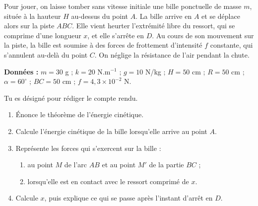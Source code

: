 \begin{center}
\end{center}

Pour jouer, on laisse tomber sans vitesse initiale une bille ponctuelle de masse $m$, située à la
hauteur $H$ au-dessus du point $A$. La bille arrive en $A$ et se déplace alors sur la piste $ABC$.
Elle vient heurter l'extrémité libre du ressort, qui se comprime d'une longueur $x$, et elle
s'arrête en $D$. Au cours de son mouvement sur la piste, la bille est soumise à des forces de
frottement d'intensité $f$ constante, qui s'annulent au-delà du point $C$. On néglige la résistance
de l'air pendant la chute.

\textbf{Données :} $m = 30$ g ; $k = 20$ N.m$^{-1}$ ; $g = 10$ N/kg ; $H = 50$ cm ; $R = 50$ cm ;
$\alpha = 60^\circ$ ; $BC = 50$ cm ; $f = 4,3 \times 10^{-2}$ N.

Tu es désigné pour rédiger le compte rendu.
\begin{enumerate}
  \item Énonce le théorème de l'énergie cinétique.
  \item Calcule l'énergie cinétique de la bille lorsqu'elle arrive au point $A$.
  \item Représente les forces qui s'exercent sur la bille :
  \begin{enumerate}[label=3.\arabic*.]
    \item au point $M$ de l'arc $AB$ et au point $M'$ de la partie $BC$ ;
    \item lorsqu'elle est en contact avec le ressort comprimé de $x$.
  \end{enumerate}
  \item Calcule $x$, puis explique ce qui se passe après l'instant d'arrêt en $D$.
\end{enumerate}


